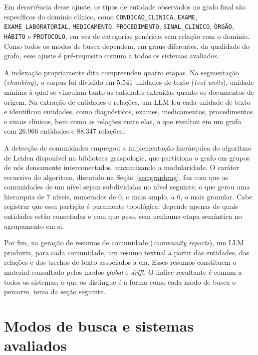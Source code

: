 Em decorrência desse ajuste, os tipos de entidade observados no grafo final são específicos do domínio clínico, como \texttt{CONDICAO\_CLINICA}, \texttt{EXAME}, \texttt{EXAME\_LABORATORIAL}, \texttt{MEDICAMENTO}, \texttt{PROCEDIMENTO}, \texttt{SINAL\_CLINICO}, \texttt{ÓRGÃO}, \texttt{HÁBITO} e \texttt{PROTOCOLO}, em vez de categorias genéricas sem relação com o domínio. Como todos os modos de busca dependem, em graus diferentes, da qualidade do grafo, esse ajuste é pré-requisito comum a todos os sistemas avaliados.

A indexação propriamente dita compreendeu quatro etapas. Na segmentação (\textit{chunking}), o corpus foi dividido em 5.541 unidades de texto (\textit{text units}), unidade mínima à qual se vinculam tanto as entidades extraídas quanto os documentos de origem. Na extração de entidades e relações, um LLM leu cada unidade de texto e identificou entidades, como diagnósticos, exames, medicamentos, procedimentos e sinais clínicos, bem como as relações entre elas, o que resultou em um grafo com 26.966 entidades e 88.347 relações.

A detecção de comunidades empregou a implementação hierárquica do algoritmo de Leiden \citep{traag2019} disponível na biblioteca graspologic, que particiona o grafo em grupos de nós densamente interconectados, maximizando a modularidade. O caráter recursivo do algoritmo, discutido na Seção~\ref{sec:graphrag}, faz com que as comunidades de um nível sejam subdivididas no nível seguinte, o que gerou uma hierarquia de 7 níveis, numerados de 0, o mais amplo, a 6, o mais granular. Cabe registrar que essa partição é puramente topológica: depende apenas de quais entidades estão conectadas e com que peso, sem nenhuma etapa semântica no agrupamento em si.

Por fim, na geração de resumos de comunidade (\textit{community reports}), um LLM produziu, para cada comunidade, um resumo textual a partir das entidades, das relações e dos trechos de texto associados a ela. Esses resumos constituem o material consultado pelos modos \textit{global} e \textit{drift}. O índice resultante é comum a todos os sistemas; o que os distingue é a forma como cada modo de busca o percorre, tema da seção seguinte.

\section{Modos de busca e sistemas avaliados}\label{sec:met-sistemas}


